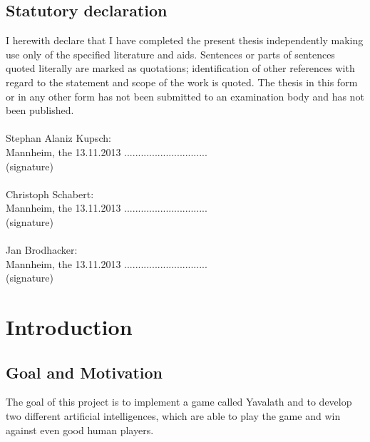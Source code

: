 \documentclass[english]{report} \usepackage[english]{babel}
\begin{document}
\newpage
\section*{Statutory declaration}\thispagestyle{empty}
I herewith declare that I have completed the present thesis independently making
use only of the specified literature and aids. Sentences or parts of sentences
quoted literally are marked as quotations; identification of other references
with regard to the statement and scope of the work is quoted. The thesis in this
form or in any other form has not been submitted to an examination body and has
not been published.\\
\\
Stephan Alaniz Kupsch:\\
Mannheim, the 13.11.2013 \hspace{2.5cm} .............................. \\
\hspace*{6.5cm} (signature)\\
\\
Christoph Schabert:\\
Mannheim, the 13.11.2013 \hspace{2.5cm} .............................. \\
\hspace*{6.5cm} (signature)\\
\\
Jan Brodhacker:\\
Mannheim, the 13.11.2013 \hspace{2.5cm} .............................. \\
\hspace*{6.5cm} (signature)\\

\newpage
\setcounter{page}{1}



\tableofcontents

\listoffigures





\newpage

\chapter{Introduction}
\label{sec:chapter1}
\section{Goal and Motivation}
The goal of this project is to implement a game called Yavalath and to develop
two different artificial intelligences, which are able to play the game and win
against even good human players.
\end{document}
